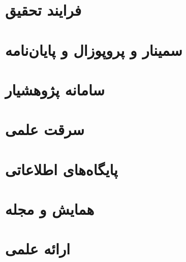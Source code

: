 \documentclass[20pt, a4paper]{article}
\begin{document}
\section{فرایند تحقیق}

\section{سمینار و پروپوزال و پایان‌نامه}

\section{سامانه پژوهشیار}

\section{سرقت علمی}

\section{پایگاه‌های اطلاعاتی}

\section{همایش و مجله}

\section{ارائه علمی}
\end{document}
